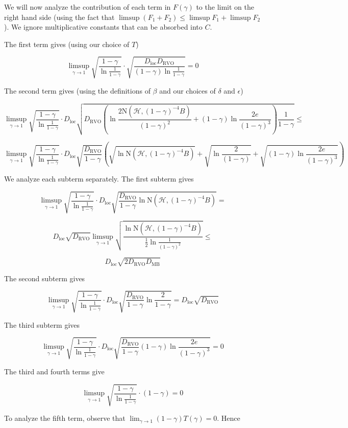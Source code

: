 \documentclass[a4paper]{article}
\newcommand{\AP}[1]{\left(#1\right)}
\newcommand{\B}{B}
\newcommand{\Hy}{\mathcal{H}}
\newcommand{\DRVO}{D_{\mathrm{RVO}}}
\newcommand{\DMB}{D_{\mathrm{MB}}}
\newcommand{\DL}{D_{\mathrm{loc}}}
\newcommand{\N}{\mathrm{N}}
\begin{document}
We will now analyze the contribution of each term in $F(\gamma)$ to the limit on the right hand side (using the fact that $\limsup\AP{F_1+F_2}\leq\limsup{F_1}+\limsup{F_2}$). We ignore multiplicative constants that can be absorbed into $C$.

The first term gives (using our choice of $T$)

$$\limsup_{\gamma\rightarrow1}{\sqrt{\frac{1-\gamma}{\ln{\frac{1}{1-\gamma}}}}\cdot\sqrt{\frac{\DL\DRVO}{(1-\gamma)\ln\frac{1}{1-\gamma}}}} = 0$$

The second term gives (using the definitions of $\beta$ and our choices of $\delta$ and $\epsilon$)

$$\limsup_{\gamma\rightarrow1}{\sqrt{\frac{1-\gamma}{\ln{\frac{1}{1-\gamma}}}}\cdot\DL\sqrt{\DRVO\AP{\ln{\frac{2\N\AP{\Hy,(1-\gamma)^{-4}\B}}{(1-\gamma)^2}}+(1-\gamma) \ln{\frac{2e}{(1-\gamma)^3}}}\frac{1}{1-\gamma}}}\leq$$

$$\limsup_{\gamma\rightarrow1}{\sqrt{\frac{1-\gamma}{\ln{\frac{1}{1-\gamma}}}}\cdot\DL\sqrt{\frac{\DRVO}{1-\gamma}}\AP{\sqrt{\ln {\N\AP{\Hy,(1-\gamma)^{-4}\B}}}+\sqrt{\ln{\frac{2}{(1-\gamma)}}}+\sqrt{(1-\gamma) \ln{\frac{2e}{(1-\gamma)^3}}}}}$$

We analyze each subterm separately. The first subterm gives

$$\limsup_{\gamma\rightarrow1}{\sqrt{\frac{1-\gamma}{\ln{\frac{1}{1-\gamma}}}}\cdot\DL\sqrt{\frac{\DRVO}{1-\gamma}\ln{\N\AP{\Hy,(1-\gamma)^{-4}\B }}}}=$$

$$\DL\sqrt{\DRVO}\limsup_{\gamma\rightarrow1}{\sqrt{\frac{\ln{\N\AP{\Hy,(1-\gamma)^{-4}\B}}}{\frac{1}{2}\ln{\frac{1}{(1-\gamma)^2}}}}}\leq$$

$$\DL\sqrt{2\DRVO\DMB}$$

The second subterm gives

$$\limsup_{\gamma\rightarrow1}{\sqrt{\frac{1-\gamma}{\ln{\frac{1}{1-\gamma}}}}\cdot\DL\sqrt{\frac{\DRVO}{1-\gamma}\ln{\frac{2}{1-\gamma}}}}=\DL\sqrt{\DRVO}$$

The third subterm gives

$$\limsup_{\gamma\rightarrow1}{\sqrt{\frac{1-\gamma}{\ln{\frac{1}{1-\gamma}}}}\cdot\DL\sqrt{\frac{\DRVO}{1-\gamma}(1-\gamma) \ln{\frac{2e}{(1-\gamma)^3}}}}=0$$

The third and fourth terms give

$$\limsup_{\gamma\rightarrow1}{\sqrt{\frac{1-\gamma}{\ln{\frac{1}{1-\gamma}}}}\cdot(1-\gamma)}=0$$

To analyze the fifth term, observe that $\lim_{\gamma\rightarrow1}{(1-\gamma)T(\gamma)}=0$. Hence
\end{document}
